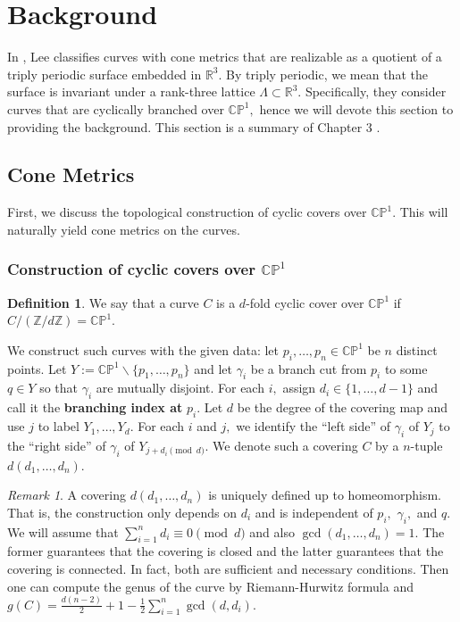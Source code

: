 \documentclass[12pt,reqno]{amsart}
\newcommand{\Z}{\mathbb{Z}}
\newcommand{\R}{\mathbb{R}}
\theoremstyle{definition}
\newtheorem{defn}{Definition}
\theoremstyle{remark}
\newtheorem*{remark}{Remark}
\begin{document}
\section{Background}
\label{sec: dthesis}
In \cite{dthesis}, Lee classifies curves with cone metrics that are realizable as a quotient of a triply periodic surface embedded in $\R^3.$ By triply periodic, we mean that the surface is invariant under a rank-three lattice $\Lambda \subset \R^3.$ Specifically, they consider curves that are cyclically branched over $\mathbb{C}\mathbb{P}^1,$ hence we will devote this section to providing the background. This section is a summary of Chapter 3 \cite{dthesis}. 

\subsection{Cone Metrics}
First, we discuss the topological construction of cyclic covers over $\mathbb{C}\mathbb{P}^1.$ This will naturally yield cone metrics on the curves.

\subsubsection*{Construction of cyclic covers over $\mathbb{C}\mathbb{P}^1$}
\begin{defn} We say that a curve $C$ is a $d$-fold cyclic cover over $\mathbb{C}\mathbb{P}^1$ if $C / (\Z/ d \Z) = \mathbb{C}\mathbb{P}^1.$ \end{defn}

We construct such curves with the given data: let $p_i, \ldots , p_n \in \mathbb{C}\mathbb{P}^1$ be $n$ distinct points. Let $Y := \mathbb{C}\mathbb{P}^1 \backslash \{p_1, \ldots, p_n\}$ and let $\gamma_i$ be a branch cut from $p_i$ to some $q \in Y$ so that $\gamma_i$ are mutually disjoint. For each $i,$ assign $d_i \in \{1, \ldots, d - 1\}$ and call it the \textbf{branching index at} $p_i.$ Let $d$ be the degree of the covering map and use $j$ to label $Y_1, \ldots , Y_d.$ For each $i$ and $j,$ we identify the ``left side'' of $\gamma_i$ of $Y_j$ to the ``right side'' of $\gamma_i$ of $Y_{j + d_i \pmod d}.$ We denote such a covering $C$ by a $n$-tuple $d (d_1, \ldots , d_n).$


\begin{remark} A covering $d (d_1, \ldots , d_n)$ is uniquely defined up to homeomorphism. That is, the construction only depends on $d_i$ and is independent of $p_i,$ $\gamma_i,$ and $q.$ We will assume that $\sum\limits_{i=1}^n d_i \equiv 0 \pmod d$ and also $\gcd (d_1, \ldots, d_n) = 1.$ The former guarantees that the covering is closed and the latter guarantees that the covering is connected. In fact, both are sufficient and necessary conditions. Then one can compute the genus of the curve by Riemann-Hurwitz formula and $g(C) = \frac{d (n-2)}{2} + 1 - \frac{1}{2} \sum\limits_{i=1}^n \gcd(d,d_i).$ 
\end{remark}
\end{document}
